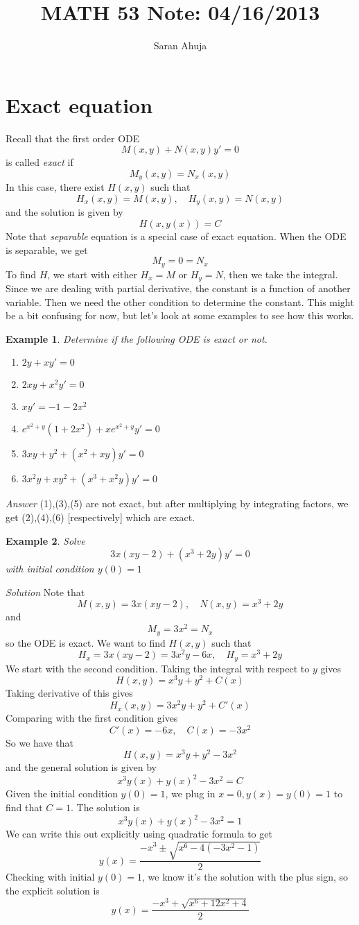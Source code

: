 \documentclass[10pt]{amsart}
\title{MATH 53 Note: 04/16/2013}
\author{Saran Ahuja}
\newtheorem{example}{Example}
\renewcommand{\ni}{\noindent}
\newcommand{\ti}{\textit}
\newcommand{\bex}{\begin{example}}
\newcommand{\eex}{\end{example}}
\begin{document}
\maketitle
\section{Exact equation}

\ni Recall that the first order ODE
$$ M(x,y)+N(x,y)y' = 0 $$
is called \textit{exact} if 
$$ M_{y}(x,y) = N_{x}(x,y) $$
In this case, there exist $H(x,y)$ such that
$$ H_{x}(x,y) = M(x,y),\quad H_{y}(x,y) =N(x,y) $$
and the solution is given by
$$ H(x,y(x)) = C$$
Note that \textit{separable} equation is a special case of exact equation. When the ODE is separable, we get
$$ M_{y} = 0 = N_{x} $$
To find $H$, we start with either $H_{x} = M$ or $H_{y} = N$, then we take the integral. Since we are dealing with partial derivative, the constant is a function of another variable. Then we need the other condition to determine the constant. This might be a bit confusing for now, but let's look at some examples to see how this works.

\bex Determine if the following ODE is exact or not.
\begin{enumerate}
	\item $2y+xy' = 0$
	\item $2xy + x^{2}y' = 0$
	\item $xy' = -1-2x^{2}$
	\item $e^{x^{2}+y}(1+2x^{2})+xe^{x^{2}+y}y' = 0$
	\item $3xy+y^{2} + (x^{2}+xy)y' = 0$
	\item  $3x^{2}y+xy^{2} + (x^{3}+x^{2}y)y' = 0$ 
\end{enumerate}
\eex
\ni\ti {Answer} (1),(3),(5) are not exact, but after multiplying by integrating factors, we get (2),(4),(6) [respectively] which are exact. 

\bex Solve  
$$3x(xy-2) + (x^{3}+ 2y) y' = 0$$ 
with initial condition $y(0)=1$
\eex

\ni\ti{Solution} Note that
$$ M(x,y) = 3x(xy-2),\quad N(x,y) = x^{3}+2y $$
and
$$ M_{y} = 3x^{2} = N_{x} $$
so the ODE is exact. We want to find $H(x,y)$ such that
$$ H_{x} = 3x(xy-2) = 3x^{2}y-6x,\quad H_{y} = x^{3}+2y $$
We start with the second condition. Taking the integral with respect to $y$ gives
$$ H(x,y) = x^{3}y+y^{2}+C(x)$$
Taking derivative of this gives
$$ H_{x}(x,y) = 3x^{2}y+y^{2}+C'(x) $$
Comparing with the first condition gives
$$ C'(x) = -6x,\quad C(x) = -3x^{2} $$
So we have that 
$$ H(x,y) = x^{3}y+y^{2}-3x^{2}$$
and the general solution is given by
$$ x^{3}y(x)+y(x)^{2}-3x^{2} = C $$
Given the initial condition $y(0)=1$, we plug in $x=0,y(x)=y(0)=1$ to find that $C=1$. The solution is
$$ x^{3}y(x)+y(x)^{2}-3x^{2} = 1 $$
We can write this out explicitly using quadratic formula to get
$$ y(x) = \frac{-x^{3}\pm\sqrt{x^{6}-4(-3x^{2}-1)}}{2} $$
Checking with initial $y(0)=1$, we know it's the solution with the plus sign, so the explicit solution is
$$ y(x) = \frac{-x^{3}+\sqrt{x^{6}+12x^{2}+4}}{2}  $$
\end{document}
